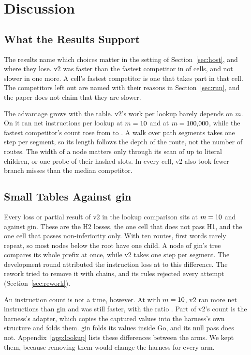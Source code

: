 \section{Discussion}\label{sec:discussion}

\subsection{What the Results Support}

The results name which choices matter in the setting of Section~\ref{sec:host}, and where they lose.
v2 was faster than the fastest competitor in \HOneSuperior{} of \HOneCells{} cells, and not slower in
one more. A cell's fastest competitor is one that takes part in that cell.
The competitors left out are named with their reasons
in Section~\ref{sec:run}, and the paper does not claim that they are slower.

The advantage grows with the table. v2's work per lookup barely depends on $m$. On  it
ran \HTwoVtwoNetStaticTen{} net instructions per lookup at $m=10$ and
\HTwoVtwoNetStaticHundredThousand{} at $m=100{,}000$, while the fastest competitor's count
rose from \HTwoFastestNetStaticTen{} to \HTwoFastestNetStaticHundredThousand. A walk over path
segments takes one step per segment, so its length follows the depth of the route, not the number of
routes. The width of a node matters only through its scan of up to \VTwoLinearEdges{} literal
children, or one probe of their hashed slots. In every cell, v2 also took fewer branch misses than
the median competitor.

\subsection{Small Tables Against gin}\label{sec:gin}

Every loss or partial result of v2 in the lookup comparison sits at $m=10$ and against gin.
These are the \HTwoLost{} H2 losses, the one cell that does not pass H1, and the one cell that passes
non-inferiority only. With ten routes, first words rarely repeat, so most nodes below the root have
one child. A node of gin's tree compares its whole prefix at once, while v2 takes one step per
segment. The development round attributed the instruction loss at  to this
difference. The rework tried to remove it with chains, and its rules rejected every attempt
(Section~\ref{sec:rework}).

An instruction count is not a time, however. At  with $m=10$, v2 ran more net
instructions than gin and was still faster, with the ratio \HOneRatioParamLastTen. Part of v2's count
is the harness's adapter, which copies the captured values into the harness's own structure and folds
them. gin folds its values inside Go, and its null pass does not. Appendix~\ref{app:lookup} lists
these differences between the arms. We kept them, because removing them would change the harness for
every arm.

